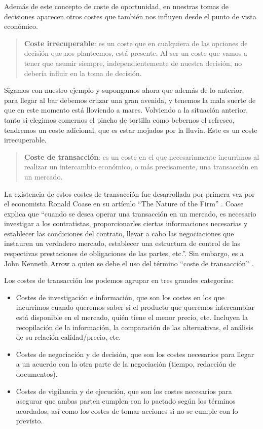 \documentclass[
]{krantz}
\providecommand{\tightlist}{%
  \setlength{\itemsep}{0pt}\setlength{\parskip}{0pt}}
\begin{document}
Además de este concepto de coste de oportunidad, en nuestras tomas de decisiones aparecen otros costes que también nos influyen desde el punto de vista económico.

\begin{quote}
\textbf{Coste irrecuperable}: es un coste que en cualquiera de las opciones de decisión que nos planteemos, está presente. Al ser un coste que vamos a tener que asumir siempre, independientemente de nuestra decisión, no debería influir en la toma de decisión.
\end{quote}

Sigamos con nuestro ejemplo y supongamos ahora que además de lo anterior, para llegar al bar debemos cruzar una gran avenida, y tenemos la mala suerte de que en este momento está lloviendo a mares. Volviendo a la situación anterior, tanto si elegimos comernos el pincho de tortilla como bebernos el refresco, tendremos un coste adicional, que es estar mojados por la lluvia. Este es un coste irrecuperable.

\begin{quote}
\textbf{Coste de transacción}: es un coste en el que necesariamente incurrimos al realizar un intercambio económico, o más precisamente, una transacción en un mercado.
\end{quote}

La existencia de estos costes de transacción fue desarrollada por primera vez por el economista Ronald Coase en su artículo ``The Nature of the Firm'' \citep{coase1937}. Coase explica que ``cuando se desea operar una transacción en un mercado, es necesario investigar a los contratistas, proporcionarles ciertas informaciones necesarias y establecer las condiciones del contrato, llevar a cabo las negociaciones que instauren un verdadero mercado, establecer una estructura de control de las respectivas prestaciones de obligaciones de las partes, etc.''. Sin embargo, es a John Kenneth Arrow a quien se debe el uso del término ``coste de transacción'' \citep{arrow1969}.

Los costes de transacción los podemos agrupar en tres grandes categorías:

\begin{itemize}
\tightlist
\item
  Costes de investigación e información, que son los costes en los que incurrimos cuando queremos saber si el producto que queremos intercambiar está disponible en el mercado, quién tiene el menor precio, etc. Incluyen la recopilación de la información, la comparación de las alternativas, el análisis de su relación calidad/precio, etc.
\item
  Costes de negociación y de decisión, que son los costes necesarios para llegar a un acuerdo con la otra parte de la negociación (tiempo, redacción de documentos).
\item
  Costes de vigilancia y de ejecución, que son los costes necesarios para asegurar que ambas parten cumplen con lo pactado según los términos acordados, así como los costes de tomar acciones si no se cumple con lo previsto.
\end{itemize}
\end{document}
